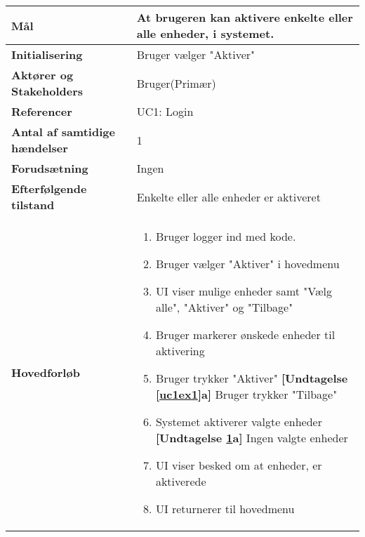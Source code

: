 \begin{table}[H] \centering
	\begin{tabular} {|p{6cm}|p{8cm}|}
	\hline		
		\textbf{Mål}							&At brugeren kan aktivere enkelte eller alle enheder, i systemet.	\\\hline
		\textbf{Initialisering}				&Bruger vælger "Aktiver" 								\\\hline
		\textbf{Aktører og Stakeholders}		&Bruger(Primær) 							\\\hline
		\textbf{Referencer}					&UC1: Login														\\\hline
		\textbf{Antal af samtidige hændelser}&1 																\\\hline
		\textbf{Forudsætning}				&Ingen														\\\hline
		\textbf{Efterfølgende tilstand}		&Enkelte eller alle enheder er aktiveret  								\\\hline
		\textbf{Hovedforløb}					
			&\begin{enumerate}
	
				\item Bruger logger ind med kode.
					
				\item Bruger vælger "Aktiver" i hovedmenu
										
				\item UI viser mulige enheder samt "Vælg alle", "Aktiver" og "Tilbage"
												
				\item \label{uc1select} Bruger markerer ønskede enheder til aktivering
												
				\item \label{uc1ex1} Bruger trykker "Aktiver"\newline
					\textbf{[Undtagelse \ref{uc1ex1}a]} Bruger trykker "Tilbage"
												
				\item \label{uc1ex2} Systemet aktiverer valgte enheder\newline
					\textbf{[Undtagelse \ref{uc1ex2}a]} Ingen valgte enheder
				
				\item UI viser besked om at enheder, er aktiverede
																	
				\item UI returnerer til hovedmenu
												
			\end{enumerate}\\\hline
		

\end{tabular}
\end{table}
